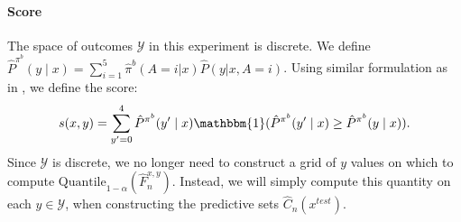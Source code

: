 \paragraph{Score} The space of outcomes $\mathcal{Y}$ in this experiment is discrete. We define $\hat{P}^{\pi^b}(y \mid x) = \sum_{i = 1}^5 \hat{\pi}^b(A = i|x) \hat{P}(y|x, A = i)$. Using similar formulation as in \cite{conf-bates}, we define the score:
$$
s(x, y) = \sum_{y' = 0}^4 \hat{P}^{\pi^b}(y' \mid x) \mathbbm{1}(\hat{P}^{\pi^b}(y' \mid x) \geq \hat{P}^{\pi^b}(y \mid x)).
$$
Since $\mathcal{Y}$ is discrete, we no longer need to construct a grid of $y$ values on which to compute $\text{Quantile}_{1-\alpha}(\hat{F}_{n}^{x, y})$. Instead, we will simply compute this quantity on each $y \in \mathcal{Y}$, when constructing the predictive sets $\hat{C}_{n}(x^{test})$.


